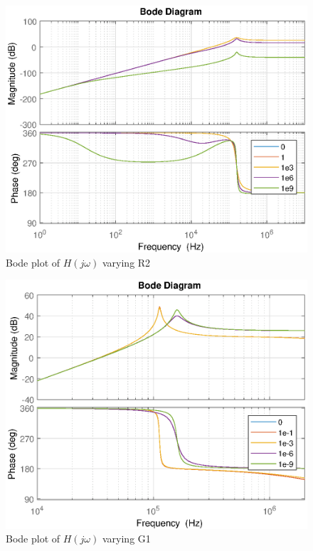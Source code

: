 \begin{figure}[H]
    \centering
    \includegraphics[width=\textwidth]{img/CoilRigBode_R2.eps}
    \caption{Bode plot of $H(j\omega)$ varying R2}
    \label{fig:bode_r2}
\end{figure}

\begin{figure}[H]
    \centering
    \includegraphics[width=\textwidth]{img/CoilRigBode_G1.eps}
    \caption{Bode plot of $H(j\omega)$ varying G1}
    \label{fig:bode_g1}
\end{figure}

